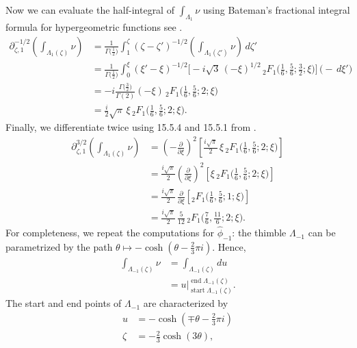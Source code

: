 \documentclass{article}
\newcommand{\fracderiv}[3]{\partial^{#1}_{#2, #3}}
\theoremstyle{definition}
\theoremstyle{plain}
\begin{document}
Now we can evaluate the half-integral of $\int_{\Lambda_1} \nu$ using Bateman's fractional integral formula for hypergeometric functions see \cite[Section 4.1]{koornwinder2015fractional}.
\begin{align*}
\fracderiv{-1/2}{\zeta}{1} \left( \int_{\Lambda_1(\zeta)} \nu \right) & = \frac{1}{\Gamma\big(\tfrac{1}{2}\big)} \int_{1}^\zeta (\zeta - \zeta')^{-1/2} \left( \int_{\Lambda_1(\zeta')} \nu \right)\,d\zeta' \\
& = \frac{1}{\Gamma\big(\tfrac{1}{2}\big)} \int_0^\xi  (\xi' - \xi)^{-1/2} \Big[ -{i}{\sqrt{3}}\, (-\xi)^{1/2}\,{}_2F_1\big(\tfrac{1}{6}, \tfrac{5}{6}; \tfrac{3}{2}; \xi\big) \Big] \,\big( -\,d\xi' \big) \\
& = -i \frac{\Gamma\big(\tfrac{3}{2}\big)}{\Gamma(2)} (-\xi)\,{}_2F_1\big(\tfrac{1}{6}, \tfrac{5}{6}; 2; \xi\big) \\
& = \frac{i}{2} \sqrt{\pi}\,\xi\, {}_2F_1\big(\tfrac{1}{6}, \tfrac{5}{6}; 2; \xi\big).
\end{align*}
Finally, we differentiate twice using 15.5.4 and 15.5.1 from \cite{dlmf}.
\begin{align*}
\fracderiv{3/2}{\zeta}{1} \left( \int_{\Lambda_1(\zeta)} \nu \right) & = \left(-\tfrac{\partial}{\partial \xi}\right)^2 \left[ \frac{i\sqrt{\pi}}{2}\,\xi\, {}_2F_1\big(\tfrac{1}{6}, \tfrac{5}{6}; 2; \xi\big) \right] \\
& =  \tfrac{i\sqrt{\pi}}{2} \left(\tfrac{\partial}{\partial \xi}\right)^2 \left[ \xi\,{}_2F_1\big(\tfrac{1}{6}, \tfrac{5}{6}; 2; \xi\big) \right] \\
& = \tfrac{i\sqrt{\pi}}{2}\,\tfrac{\partial}{\partial \xi} \left[ {}_2F_1\big(\tfrac{1}{6}, \tfrac{5}{6}; 1; \xi\big) \right] \\
& = \tfrac{i\sqrt{\pi}}{2}\,\tfrac{5}{12}\, {}_2F_1\big(\tfrac{7}{6}, \tfrac{11}{6}; 2; \xi\big).
\end{align*}
%
For completeness, we repeat the computations for $\hat{\phi}_{-1}$: the thimble $\Lambda_{-1}$ can be parametrized by the path $\theta \mapsto -\cosh(\theta - \tfrac{2}{3}\pi i)$. Hence,
\begin{align*}
\int_{\Lambda_{-1}(\zeta)} \nu & = \int_{\Lambda_{-1}(\zeta)} du \\
& = u \Big|_{\operatorname{start} \Lambda_{-1}(\zeta)}^{\operatorname{end}\Lambda_{-1}(\zeta)}.
\end{align*}
The start and end points of $\Lambda_{-1}$ are characterized by
\begin{align*}
u & = -\cosh(\mp\theta - \tfrac{2}{3}\pi i) \\
\zeta & = -\tfrac{2}{3} \cosh(3\theta),
\end{align*}
\end{document}
